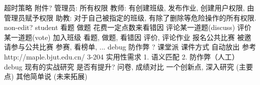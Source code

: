 \markdownRendererUlItem 超时策略\markdownRendererUlItemEnd 
\markdownRendererUlItem 附件?\markdownRendererUlItemEnd 
\markdownRendererUlEndTight \markdownRendererInterblockSeparator
{}\markdownRendererInterblockSeparator
{}\markdownRendererUlBeginTight
\markdownRendererUlItem 管理员: 所有权限\markdownRendererUlItemEnd 
\markdownRendererUlItem 教师: 有创建班级, 发布作业, 创建用户权限, 由管理员赋予权限\markdownRendererUlItemEnd 
\markdownRendererUlItem 助教: 对于自己被指定的班级, 有除了删除等危险操作的所有权限.\markdownRendererUlItemEnd 
\markdownRendererUlItem non-edit?\markdownRendererUlItemEnd 
\markdownRendererUlItem student\markdownRendererUlItemEnd 
\markdownRendererUlEndTight \markdownRendererInterblockSeparator
{}\markdownRendererInterblockSeparator
{}\markdownRendererInterblockSeparator
{}\markdownRendererUlBeginTight
\markdownRendererUlItem 看题\markdownRendererUlItemEnd 
\markdownRendererUlItem 做题\markdownRendererUlItemEnd 
\markdownRendererUlItem 花费一定点数来看错因\markdownRendererUlItemEnd 
\markdownRendererUlItem 评论某一道题(discuss)\markdownRendererUlItemEnd 
\markdownRendererUlItem 评价某一道题(vote)\markdownRendererUlItemEnd 
\markdownRendererUlEndTight \markdownRendererInterblockSeparator
{}\markdownRendererInterblockSeparator
{}\markdownRendererUlBeginTight
\markdownRendererUlItem 加入班级\markdownRendererUlItemEnd 
\markdownRendererUlItem 看题, 做题, 看错因\markdownRendererUlItemEnd 
\markdownRendererUlItem 评价, 评论作业\markdownRendererUlItemEnd 
\markdownRendererUlItem \markdownRendererUlItemEnd 
\markdownRendererUlEndTight \markdownRendererInterblockSeparator
{}\markdownRendererInterblockSeparator
{}\markdownRendererUlBeginTight
\markdownRendererUlItem 报名公共比赛\markdownRendererUlItemEnd 
\markdownRendererUlItem 被邀请参与公共比赛\markdownRendererUlItemEnd 
\markdownRendererUlItem 参赛, 看榜单, ...\markdownRendererUlItemEnd 
\markdownRendererUlEndTight \markdownRendererInterblockSeparator
{}\markdownRendererInterblockSeparator
{}debug 防作弊 ? 课堂派 课件方式 自动放出 参考  http://maple.bjut.edu.cn/ 3-204\markdownRendererInterblockSeparator
{}实用性需求 1. 语义匹配 2. 防作弊（人工）\markdownRendererInterblockSeparator
{}debug\markdownRendererInterblockSeparator
{}现有的实战研究 是否有提升?\markdownRendererInterblockSeparator
{}问卷, 成绩对比\markdownRendererInterblockSeparator
{}一个创新点, 深入研究 (主要点) 其他简单说 (未来拓展)\relax
